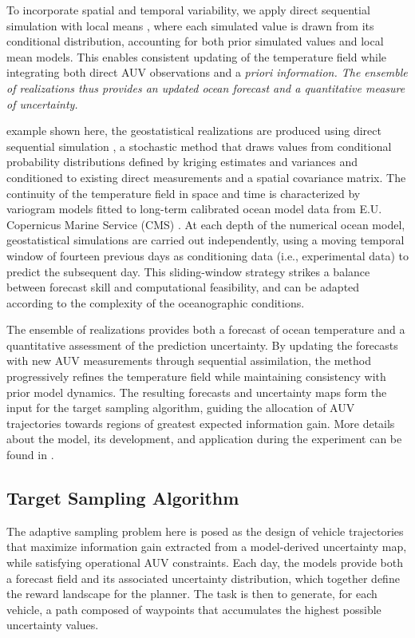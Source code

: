 To incorporate spatial and temporal variability, we apply direct sequential simulation with local means \cite{soares2001direct}, where each simulated value is drawn from its conditional distribution, accounting for both prior simulated values and local mean models. This enables consistent updating of the temperature field while integrating both direct AUV observations and a \it{priori} information. The ensemble of realizations thus provides an updated ocean forecast and a quantitative measure of uncertainty.
 
example shown here, the geostatistical realizations are produced using direct sequential simulation \cite{soares2001direct}, a stochastic method that draws values from conditional probability distributions defined by kriging estimates and variances and conditioned to existing
direct measurements and a spatial covariance matrix. The continuity of the temperature field in space and time is characterized by variogram models fitted to long-term calibrated ocean model data from E.U. Copernicus Marine Service (CMS) \cite{CMEMS2017}. At each depth of the numerical ocean model, geostatistical simulations are carried out independently, using a moving temporal window of fourteen previous   days as
conditioning data (i.e., experimental data) to predict the subsequent day. This sliding-window strategy strikes a balance between forecast skill and computational feasibility, and can be adapted according to the complexity of the oceanographic conditions.

The ensemble of realizations provides both a forecast of ocean
temperature and a quantitative assessment of the prediction
uncertainty.  By updating the forecasts with new AUV measurements
through sequential assimilation, the method progressively refines the
temperature field while maintaining consistency with prior model
dynamics. The resulting forecasts and uncertainty maps form the input
for the target sampling algorithm, guiding the allocation of AUV
trajectories towards regions of greatest expected information
gain. More details about the model, its development, and application
during the \proj experiment can be found in \cite{Duarte2025}.

\subsection{Target Sampling Algorithm}

The adaptive sampling problem here is posed as the design of vehicle
trajectories that maximize information gain
\cite{eidsvik2015,fossum18} extracted from a model-derived uncertainty
map, while satisfying operational AUV constraints. Each day, the
models provide both a forecast field and its associated uncertainty
distribution, which together define the reward landscape for the
planner. The task is then to generate, for each vehicle, a path
composed of waypoints that accumulates the highest possible
uncertainty values.

